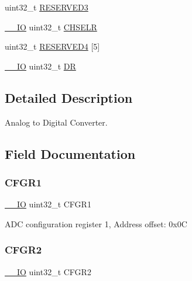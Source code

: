 \begin{DoxyCompactItemize}
\item 
uint32\+\_\+t \hyperlink{struct_a_d_c___type_def_af2b40c5e36a5e861490988275499e158}{R\+E\+S\+E\+R\+V\+E\+D3}
\item 
\hyperlink{core__sc300_8h_aec43007d9998a0a0e01faede4133d6be}{\+\_\+\+\_\+\+IO} uint32\+\_\+t \hyperlink{struct_a_d_c___type_def_a0ffde5fc9674bafc8a44e80cf36953a3}{C\+H\+S\+E\+LR}
\item 
uint32\+\_\+t \hyperlink{struct_a_d_c___type_def_a49083e2b5eda616f714b3fd18136d680}{R\+E\+S\+E\+R\+V\+E\+D4} \mbox{[}5\mbox{]}
\item 
\hyperlink{core__sc300_8h_aec43007d9998a0a0e01faede4133d6be}{\+\_\+\+\_\+\+IO} uint32\+\_\+t \hyperlink{struct_a_d_c___type_def_a3df0d8dfcd1ec958659ffe21eb64fa94}{DR}
\end{DoxyCompactItemize}


\subsection{Detailed Description}
Analog to Digital Converter. 

\subsection{Field Documentation}
\mbox{\label{struct_a_d_c___type_def_a7a12ab903dcfa91c96beb2e36562eed6}} 
\subsubsection{\texorpdfstring{C\+F\+G\+R1}{CFGR1}}
{\footnotesize\ttfamily \hyperlink{core__sc300_8h_aec43007d9998a0a0e01faede4133d6be}{\+\_\+\+\_\+\+IO} uint32\+\_\+t C\+F\+G\+R1}

A\+DC configuration register 1, Address offset\+: 0x0C \mbox{\label{struct_a_d_c___type_def_ad587bd6f59142b90c879b7c8aaf1bb8c}} 
\subsubsection{\texorpdfstring{C\+F\+G\+R2}{CFGR2}}
{\footnotesize\ttfamily \hyperlink{core__sc300_8h_aec43007d9998a0a0e01faede4133d6be}{\+\_\+\+\_\+\+IO} uint32\+\_\+t C\+F\+G\+R2}

